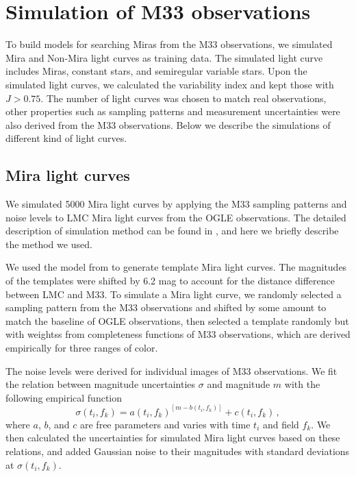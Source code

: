 \section{Simulation of M33 observations} \label{sec.simulation}







To build models for searching Miras from the M33 observations, we simulated Mira and Non-Mira light curves as training data. The simulated light curve includes Miras, constant stars, and semiregular variable stars. Upon the simulated light curves, we calculated the variability index and kept those with $J>0.75$. The number of light curves was chosen to match real observations, other properties such as sampling patterns and measurement uncertainties were also derived from the M33 observations. Below we describe the simulations of different kind of light curves.

\subsection{Mira light curves}
We simulated 5000 Mira light curves by applying the M33 sampling patterns and noise levels to LMC Mira light curves from the OGLE observations. The detailed description of simulation method can be found in , and here we briefly describe the method we used. 

We used the model from  to generate template Mira light curves. The magnitudes of the templates were shifted by 6.2 mag to account for the distance difference between LMC and M33. To simulate a Mira light curve, we randomly selected a sampling pattern from the M33 observations and shifted by some amount to match the baseline of OGLE observations, then selected a template randomly but with weightss from completeness functions of M33 observations, which are derived empirically for three ranges of color.

The noise levels were derived for individual images of M33 observations. We fit the relation between magnitude uncertainties $\sigma$ and magnitude $m$ with the following empirical function
\begin{equation}
\sigma(t_i,f_k) = a(t_i,f_k)^{[m-b(t_i,f_k)]} + c(t_i,f_k)\,, \label{equ.sigma.mag}
\end{equation}
where $a$, $b$, and $c$ are free parameters and varies with time $t_i$ and field $f_k$. We then calculated the uncertainties for simulated Mira light curves based on these relations, and added Gaussian noise to their magnitudes with standard deviations at $\sigma(t_i,f_k)$.

